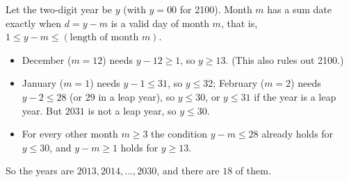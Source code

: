 Let the two-digit year be $y$ (with $y=00$ for 2100). Month $m$ has a sum date exactly when $d=y-m$ is a valid day of month $m$, that is, $1\le y-m\le(\text{length of month }m)$.
\begin{itemize}
\item December ($m=12$) needs $y-12\ge1$, so $y\ge13$. (This also rules out 2100.)
\item January ($m=1$) needs $y-1\le31$, so $y\le32$; February ($m=2$) needs $y-2\le28$ (or $29$ in a leap year), so $y\le30$, or $y\le31$ if the year is a leap year. But $2031$ is not a leap year, so $y\le30$.
\item For every other month $m\ge3$ the condition $y-m\le28$ already holds for $y\le30$, and $y-m\ge1$ holds for $y\ge13$.
\end{itemize}
So the years are $2013,2014,\dots,2030$, and there are $\boxed{18}$ of them.
